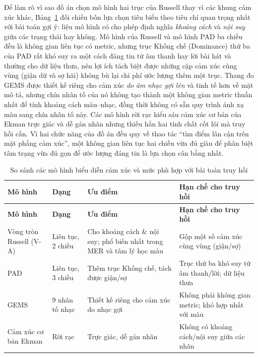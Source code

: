 \documentclass[../DoAn.tex]{subfiles}
\begin{document}
Để làm rõ vì sao đồ án chọn mô hình hai trục của Russell thay vì các khung cảm xúc khác, Bảng~\ref{table:emotion-models} đối chiếu bốn lựa chọn tiêu biểu theo tiêu chí quan trọng nhất với bài toán gợi ý: liệu mô hình có cho phép định nghĩa \textit{khoảng cách} và \textit{nội suy} giữa các trạng thái hay không. Mô hình của Russell và mô hình PAD ba chiều \cite{russellmehrabian1977pad} đều là không gian liên tục có metric, nhưng trục Khống chế (Dominance) thứ ba của PAD rất khó suy ra một cách đáng tin từ âm thanh hay lời bài hát và thường cho dữ liệu thưa, nên lợi ích tách biệt được những cặp cảm xúc cùng vùng (giận dữ và sợ hãi) không bù lại chi phí ước lượng thêm một trục. Thang đo GEMS \cite{zentner2008gems} được thiết kế riêng cho cảm xúc \textit{do âm nhạc gợi lên} và tinh tế hơn về mặt mô tả, nhưng chín nhân tố của nó không tạo thành một không gian metric thuần nhất để tính khoảng cách màu--nhạc, đồng thời không có sẵn quy trình ánh xạ màu sang chín nhân tố này. Các mô hình rời rạc kiểu sáu cảm xúc cơ bản của Ekman \cite{ekman1992basic} trực giác và dễ gán nhãn nhưng thiếu hẳn hai tính chất cốt lõi mà truy hồi cần. Vì hai chức năng của đồ án đều quy về thao tác ``tìm điểm lân cận trên mặt phẳng cảm xúc'', một không gian liên tục hai chiều vừa đủ giàu để phân biệt tâm trạng vừa đủ gọn để ước lượng đáng tin là lựa chọn cân bằng nhất.

\begin{longtable}{|p{2.7cm}|p{2.0cm}|p{3.5cm}|p{3.6cm}|}
\caption{So sánh các mô hình biểu diễn cảm xúc và mức phù hợp với bài toán truy hồi}\label{table:emotion-models}\\
\hline
\textbf{Mô hình} & \textbf{Dạng} & \textbf{Ưu điểm} & \textbf{Hạn chế cho truy hồi} \\
\hline
\endfirsthead
\hline
\textbf{Mô hình} & \textbf{Dạng} & \textbf{Ưu điểm} & \textbf{Hạn chế cho truy hồi} \\
\hline
\endhead
Vòng tròn Russell (V-A) \cite{russell1980circumplex} & Liên tục, 2 chiều & Cho khoảng cách \& nội suy; phổ biến nhất trong MER và tâm lý học màu & Gộp một số cảm xúc cùng vùng (giận/sợ) \\
\hline
PAD \cite{russellmehrabian1977pad} & Liên tục, 3 chiều & Thêm trục Khống chế, tách được giận/sợ & Trục thứ ba khó suy từ âm thanh/lời; dữ liệu thưa \\
\hline
GEMS \cite{zentner2008gems} & 9 nhân tố nhạc & Thiết kế riêng cho cảm xúc do nhạc gợi & Không phải không gian metric; khó hợp nhất với màu \\
\hline
Cảm xúc cơ bản Ekman \cite{ekman1992basic} & Rời rạc & Trực giác, dễ gán nhãn & Không có khoảng cách/nội suy giữa các nhãn \\
\hline
\end{longtable}
\end{document}
